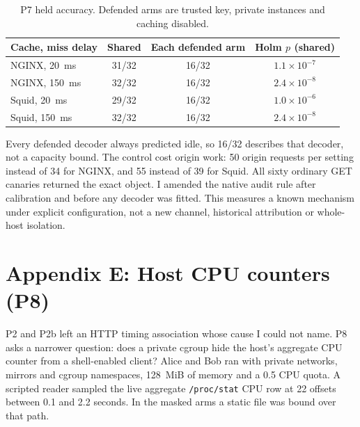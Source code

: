{\begin{table}[!ht]\centering\small
\begin{tabular}{lccc}\toprule
Cache, miss delay & Shared & Each defended arm & Holm $p$ (shared) \\\midrule
NGINX, 20~ms & 31/32 & 16/32 & $1.1\times10^{-7}$ \\
NGINX, 150~ms & 32/32 & 16/32 & $2.4\times10^{-8}$ \\
Squid, 20~ms & 29/32 & 16/32 & $1.0\times10^{-6}$ \\
Squid, 150~ms & 32/32 & 16/32 & $2.4\times10^{-8}$ \\\bottomrule
\end{tabular}
\caption{P7 held accuracy. Defended arms are trusted key, private instances and caching disabled.}
\end{table}

Every defended decoder always predicted idle, so 16/32 describes that decoder, not a capacity bound.
The control cost origin work:
50 origin requests per setting instead of 34 for NGINX, and 55 instead of 39 for Squid.
All sixty ordinary GET canaries returned the exact object.
I amended the native audit rule after calibration and before any decoder was fitted.
This measures a known mechanism under explicit configuration, not a new channel, historical attribution or whole-host isolation.

\section*{Appendix E: Host CPU counters (P8)}

P2 and P2b left an HTTP timing association whose cause I could not name.
P8 asks a narrower question: does a private cgroup hide the host's aggregate CPU counter from a shell-enabled client?
Alice and Bob ran with private networks, mirrors and cgroup namespaces, 128~MiB of memory and a 0.5 CPU quota.
A scripted reader sampled the live aggregate \texttt{/proc/stat} CPU row at 22 offsets between 0.1 and 2.2 seconds.
In the masked arms a static file was bound over that path.

}
